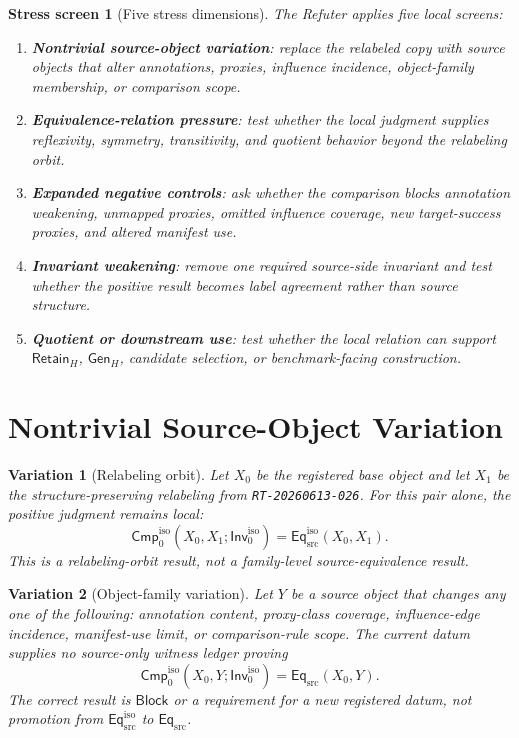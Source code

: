 \documentclass[11pt]{article}
\newcommand{\Inv}{\mathsf{Inv}_{0}^{\mathrm{iso}}}
\newcommand{\Cmp}{\mathsf{Cmp}_{0}^{\mathrm{iso}}}
\newcommand{\EqSrc}{\mathsf{Eq}_{\mathrm{src}}}
\newcommand{\EqIso}{\mathsf{Eq}_{\mathrm{src}}^{\mathrm{iso}}}
\newcommand{\GenH}{\mathsf{Gen}_{H}}
\newcommand{\RetainH}{\mathsf{Retain}_{H}}
\newcommand{\Block}{\mathsf{Block}}
\newtheorem{screen}{Stress screen}
\newtheorem{variant}{Variation}
\begin{document}
\begin{screen}[Five stress dimensions]
The Refuter applies five local screens:
\begin{enumerate}
    \item \textbf{Nontrivial source-object variation}: replace the
    relabeled copy with source objects that alter annotations, proxies,
    influence incidence, object-family membership, or comparison scope.
    \item \textbf{Equivalence-relation pressure}: test whether the local
    judgment supplies reflexivity, symmetry, transitivity, and quotient
    behavior beyond the relabeling orbit.
    \item \textbf{Expanded negative controls}: ask whether the comparison
    blocks annotation weakening, unmapped proxies, omitted influence
    coverage, new target-success proxies, and altered manifest use.
    \item \textbf{Invariant weakening}: remove one required source-side
    invariant and test whether the positive result becomes label agreement
    rather than source structure.
    \item \textbf{Quotient or downstream use}: test whether the local
    relation can support \(\RetainH\), \(\GenH\), candidate selection, or
    benchmark-facing construction.
\end{enumerate}
\end{screen}

\section{Nontrivial Source-Object Variation}

\begin{variant}[Relabeling orbit]
Let \(X_{0}\) be the registered base object and let \(X_{1}\) be the
structure-preserving relabeling from \texttt{RT-20260613-026}. For this
pair alone, the positive judgment remains local:
\[
    \Cmp(X_{0},X_{1};\Inv)=\EqIso(X_{0},X_{1}).
\]
This is a relabeling-orbit result, not a family-level source-equivalence
result.
\end{variant}

\begin{variant}[Object-family variation]
Let \(Y\) be a source object that changes any one of the following:
annotation content, proxy-class coverage, influence-edge incidence,
manifest-use limit, or comparison-rule scope. The current datum supplies
no source-only witness ledger proving
\[
    \Cmp(X_{0},Y;\Inv)=\EqSrc(X_{0},Y).
\]
The correct result is \(\Block\) or a requirement for a new registered
datum, not promotion from \(\EqIso\) to \(\EqSrc\).
\end{variant}
\end{document}
